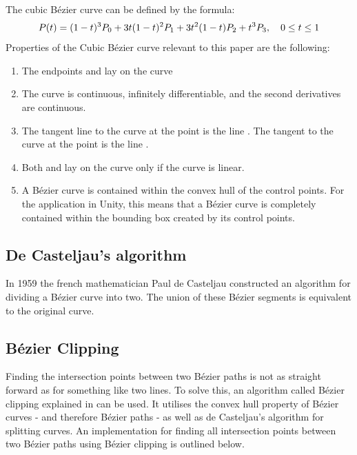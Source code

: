     
        The cubic Bézier curve can be defined by the formula\cite{Cubic-Bézier-Curves}: 
        $$
            P(t) = (1-t)^3P_0 + 3t(1 - t)^2P_1 + 3t^2(1 - t)P_2 + t^3P_3 , \quad 0 \le t \le 1
        $$
        Properties of the Cubic Bézier curve relevant to this paper are the following:
        \begin{enumerate}
            \item The endpoints  and  lay on the curve
            \item The curve is continuous, infinitely differentiable, and the second derivatives are continuous.
            \item The tangent line to the curve at the point  is the line . The tangent to the
        curve at the point  is the line .
            \item Both  and  lay on the curve only if the curve is linear.
            \item A Bézier curve is contained within the convex hull of the control points. For the application in Unity, this means that a Bézier curve is completely contained within the bounding box created by its control points.
        \end{enumerate}

    \subsection{De Casteljau's algorithm}
        In 1959 the french mathematician Paul de Casteljau constructed an algorithm for dividing a Bézier curve into two. The union of these Bézier segments is equivalent to the original curve.
    
    \subsection{Bézier Clipping}
        Finding the intersection points between two Bézier paths is not as straight forward as for something like two lines. To solve this, an algorithm called Bézier clipping explained in \cite{bezier-clipping} can be used. It utilises the convex hull property of Bézier curves - and therefore Bézier paths - as well as de Casteljau's algorithm for splitting curves. An implementation for finding all intersection points between two Bézier paths using Bézier clipping is outlined below.

